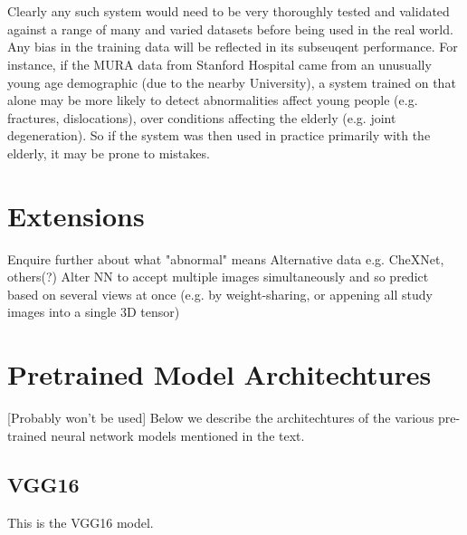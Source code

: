 \documentclass[11pt]{article} %
\theoremstyle{plain}
\theoremstyle{definition}
\begin{document}
\\
\\
\noindent
Clearly any such system would need to be very thoroughly tested and validated against a range of many and varied datasets before being used in the real world. Any bias in the training data will be reflected in its subseuqent performance. For instance, if the MURA data from Stanford Hospital came from an unusually young age demographic (due to the nearby University), a system trained on that alone may be more likely to detect abnormalities affect young people (e.g. fractures, dislocations), over conditions affecting the elderly (e.g. joint degeneration). So if the system was then used in practice primarily with the elderly, it may be prone to mistakes.


\newpage
\section{Extensions}
Enquire further about what "abnormal" means
Alternative data e.g. CheXNet, others(?)
Alter NN to accept multiple images simultaneously and so predict based on several views at once (e.g. by weight-sharing, or appening all study images into a single 3D tensor)




\clearpage



\clearpage
\appendix
\section{Pretrained Model Architechtures}
[Probably won't be used]
Below we describe the architechtures of the various pre-trained neural network models mentioned in the text.
\subsection{VGG16}
This is the VGG16 model.
\end{document}
